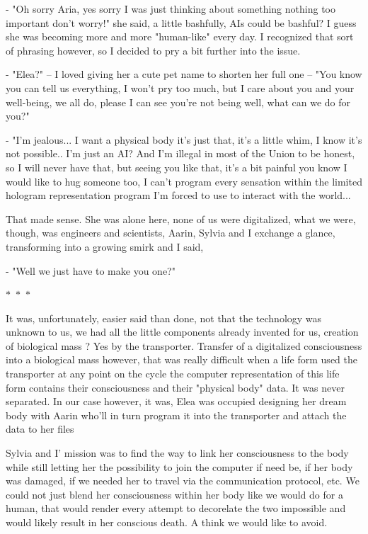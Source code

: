 \documentclass[colorlinks,12pt,a4paper]{book}
\newcommand\sep{\begin{center}
  \boldmath $\ast$~$\ast$~$\ast$
\end{center}}
\begin{document}
 - "Oh sorry Aria, yes sorry I was just thinking about something nothing too important don't worry!" she said, a little bashfully, AIs could be 
 bashful? I guess she was becoming more and more "human-like" every day. I recognized that sort of phrasing however, so I decided to pry a bit further 
 into the issue.
 
 - "Elea?" -- I loved giving her a cute pet name to shorten her full one -- "You know you can tell us everything, I won't pry too much, but I care 
 about you and your well-being, we all do, please I can see you're not being well, what can we do for you?"\par 
 \bigskip 
 
 - "I'm jealous... I want a physical body it's just that, it's a little whim, I know it's not possible.. I'm just an AI? And I'm illegal in most of the 
 Union to be honest, so I will never have that, but seeing you like that, it's a bit painful you know I would like to hug someone too, I can't program every 
 sensation within the limited hologram representation program I'm forced to use to interact with the world...\par 
 \bigskip 
 
 That made sense. She was alone here, none of us were digitalized, what we were, though, was engineers and scientists, Aarin, Sylvia and I
 exchange a glance, transforming into a growing smirk and I said,\par 
 - "Well we just have to make you one?"
 
 \sep 
 
 It was, unfortunately, easier said than done, not that the technology was unknown to us, we had all the little components already invented for us, 
 creation of biological mass ? Yes by the transporter. Transfer of a digitalized consciousness into a biological mass however, that was really difficult 
 when a life form used the transporter at any point on the cycle the computer representation of this life form contains their consciousness and their "physical body"
 data. It was never separated. In our case however, it was, Elea was occupied designing her dream body with Aarin who'll in turn program it into the transporter 
 and attach the data to her files\par 
 \bigskip 
 
 Sylvia and I' mission was to find the way to link her consciousness to the body while still letting her the possibility to join the computer if need be,
 if her body was damaged, if we needed her to travel via the communication protocol, etc. We could not just blend her consciousness within her body like we would 
 do for a human, that would render every attempt to decorelate the two impossible and would likely result in her conscious death. A think we would like to avoid.\par 
 \bigskip 
 
\end{document}
